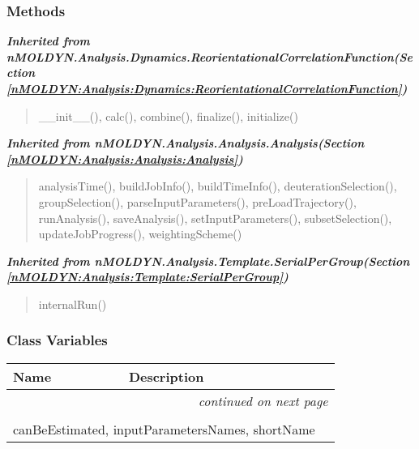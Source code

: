 
  \subsubsection{Methods}


\large{\textbf{\textit{Inherited from nMOLDYN.Analysis.Dynamics.ReorientationalCorrelationFunction\textit{(Section \ref{nMOLDYN:Analysis:Dynamics:ReorientationalCorrelationFunction})}}}}

\begin{quote}
\_\_init\_\_(), calc(), combine(), finalize(), initialize()
\end{quote}

\large{\textbf{\textit{Inherited from nMOLDYN.Analysis.Analysis.Analysis\textit{(Section \ref{nMOLDYN:Analysis:Analysis:Analysis})}}}}

\begin{quote}
analysisTime(), buildJobInfo(), buildTimeInfo(), deuterationSelection(), groupSelection(), parseInputParameters(), preLoadTrajectory(), runAnalysis(), saveAnalysis(), setInputParameters(), subsetSelection(), updateJobProgress(), weightingScheme()
\end{quote}

\large{\textbf{\textit{Inherited from nMOLDYN.Analysis.Template.SerialPerGroup\textit{(Section \ref{nMOLDYN:Analysis:Template:SerialPerGroup})}}}}

\begin{quote}
internalRun()
\end{quote}


  \subsubsection{Class Variables}

    \vspace{-1cm}
\hspace{\varindent}\begin{longtable}{|p{\varnamewidth}|p{\vardescrwidth}|l}
\cline{1-2}
\cline{1-2} \centering \textbf{Name} & \centering \textbf{Description}& \\
\cline{1-2}
\endhead\cline{1-2}\multicolumn{3}{r}{\small\textit{continued on next page}}\\\endfoot\cline{1-2}
\endlastfoot\multicolumn{2}{|l|}{\textit{Inherited from nMOLDYN.Analysis.Dynamics.ReorientationalCorrelationFunction \textit{(Section \ref{nMOLDYN:Analysis:Dynamics:ReorientationalCorrelationFunction})}}}\\
\multicolumn{2}{|p{\varwidth}|}{\raggedright canBeEstimated, inputParametersNames, shortName}\\
\cline{1-2}
\end{longtable}

